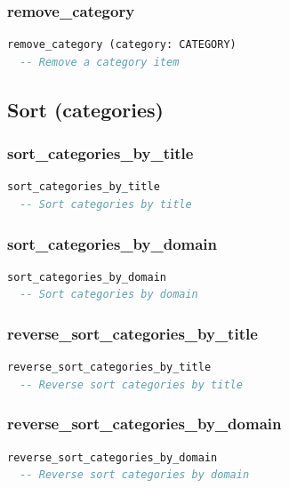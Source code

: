 \subsubsection{remove\_category}

\begin{lstlisting}[language=Eiffel]
remove_category (category: CATEGORY)
  -- Remove a category item
\end{lstlisting}

\subsection{Sort (categories)}
\label{sec:item-sort-categories}

\subsubsection{sort\_categories\_by\_title}

\begin{lstlisting}[language=Eiffel]
sort_categories_by_title
  -- Sort categories by title
\end{lstlisting}

\subsubsection{sort\_categories\_by\_domain}

\begin{lstlisting}[language=Eiffel]
sort_categories_by_domain
  -- Sort categories by domain
\end{lstlisting}

\subsubsection{reverse\_sort\_categories\_by\_title}

\begin{lstlisting}[language=Eiffel]
reverse_sort_categories_by_title
  -- Reverse sort categories by title
\end{lstlisting}

\subsubsection{reverse\_sort\_categories\_by\_domain}

\begin{lstlisting}[language=Eiffel]
reverse_sort_categories_by_domain
  -- Reverse sort categories by domain
\end{lstlisting}

